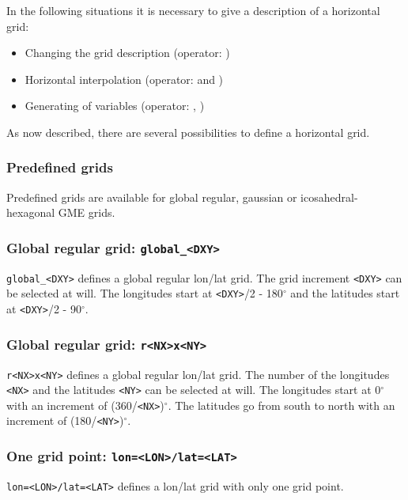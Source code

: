 In the following situations it is necessary to give a description of a horizontal grid:

\begin{itemize}
\item Changing the grid description (operator: )
\item Horizontal interpolation (operator:  and )
\item Generating of variables (operator: , )
\end{itemize}

As now described, there are several possibilities to define a horizontal grid.

\subsubsection{Predefined grids}

Predefined grids are available for global regular, gaussian or icosahedral-hexagonal GME grids.

\subsubsection*{Global regular grid: {\tt global\_<DXY>}}
    {\tt global\_<DXY>} defines a global regular lon/lat grid.
    The grid increment {\tt <DXY>} can be selected at will.
    The longitudes start at {\tt  <DXY>}/2 - 180$^\circ$ and the
    latitudes start at {\tt <DXY>}/2 - 90$^\circ$.

\subsubsection*{Global regular grid: {\tt r<NX>x<NY>}}
    {\tt r<NX>x<NY>} defines a global regular lon/lat grid.
    The number of the longitudes {\tt <NX>} and the latitudes {\tt <NY>} can be selected at will.
    The longitudes start at 0$^\circ$ with an increment of (360/{\tt <NX>})$^\circ$.
    The latitudes go from south to north with an increment of (180/{\tt <NY>})$^\circ$.

\subsubsection*{One grid point: {\tt lon=<LON>/lat=<LAT>}}
    {\tt lon=<LON>/lat=<LAT>} defines a lon/lat grid with only one grid point.

